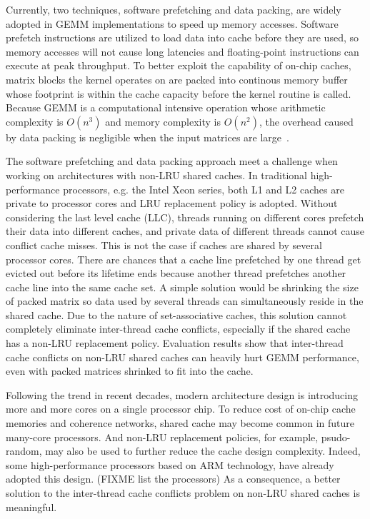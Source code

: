 Currently, two techniques, software prefetching and data packing,
are widely adopted in GEMM implementations to speed up memory accesses.
Software prefetch instructions are utilized
to load data into cache before they are used, so memory accesses will not
cause long latencies and floating-point instructions can execute at peak throughput.
To better exploit the capability of on-chip caches,
matrix blocks the kernel operates on are packed into continous memory buffer
whose footprint is within the cache capacity before the kernel routine is called.
Because GEMM is a computational intensive operation whose
arithmetic complexity is $O(n^3)$ and memory complexity is $O(n^2)$,
the overhead caused by data packing is negligible when
the input matrices are large~\cite{gotogemm}.

The software prefetching and data packing approach meet a challenge
when working on architectures with non-LRU shared caches.
In traditional high-performance processors, e.g. the Intel Xeon series,
both L1 and L2 caches are private to processor cores
and LRU replacement policy is adopted.
Without considering the last level cache (LLC),
threads running on different cores prefetch their data into
different caches, and private data of different threads
cannot cause conflict cache misses.
This is not the case if caches are shared by several processor cores.
There are chances that a cache line prefetched by one thread
get evicted out before its lifetime ends because another thread prefetches
another cache line into the same cache set.
A simple solution would be shrinking the size of packed matrix
so data used by several threads can simultaneously reside in the shared cache.
Due to the nature of set-associative caches,
this solution cannot completely eliminate inter-thread cache conflicts,
especially if the shared cache has a non-LRU replacement policy.
Evaluation results show that inter-thread cache conflicts on non-LRU shared caches
can heavily hurt GEMM performance,
even with packed matrices shrinked to fit into the cache.

Following the trend in recent decades, modern architecture design
is introducing more and more cores on a single processor chip.
To reduce cost of on-chip cache memories and coherence networks,
shared cache may become common in future many-core processors.
And non-LRU replacement policies, for example, psudo-random,
may also be used to further reduce the cache design complexity.
Indeed, some high-performance processors based on ARM technology,
have already adopted this design. (FIXME list the processors)
As a consequence, a better solution to the inter-thread cache conflicts problem
on non-LRU shared caches is meaningful.

